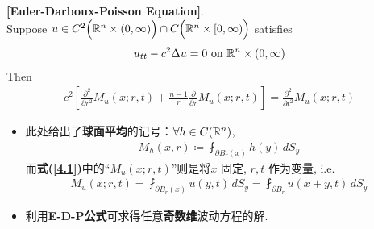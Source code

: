 	\begin{thm}\label{thm 4.1.1}
		\textbf{[Euler-Darboux-Poisson Equation]}. \\
		Suppose $u \in C^2\Big( \mathbb{R}^n \times (0 , \infty) \Big) \cap C \Big( \mathbb{R}^n \times [0 , \infty) \Big)$ satisfies 
		\begin{align*}
			u_{tt} - c^2 \Delta u = 0 \,\, \text{on} \,\, \mathbb{R}^n \times (0 , \infty)
		\end{align*}
		Then 
		\begin{align}
			c^2 \left[ \frac{\partial^2}{\partial r^2} M_{u}(x ; r , t) + \frac{n - 1}{r} \frac{\partial}{\partial r} M_u(x ; r , t) \right] 
			= \frac{\partial^2}{\partial t^2} M_u(x ; r , t) \label{4.1}
		\end{align}
		
		\vspace*{4em}
		
		\begin{rmk}
			\begin{itemize}
				\item 此处给出了\textbf{球面平均}的记号：$\forall h \in C(\mathbb{R}^n)$, 
				\begin{align*}
					M_h(x , r) \coloneqq \fint_{\partial B_{r}(x)} h(y) \, dS_y
				\end{align*}
				而\textbf{式(\ref{4.1})}中的“$M_u(x ; r , t)$”则是将$x$ 固定, $r , t$ 作为变量, i.e. 
				\begin{align*}
					M_u(x ; r , t) 
					= \fint_{\partial B_r(x)} u(y , t) \, dS_y 
					= \fint_{\partial B_r} u(x + y , t) \, dS_y
				\end{align*}
				
				\vspace*{2em}
				
				\item 利用\textbf{E-D-P公式}可求得任意\textbf{奇数维}波动方程的解. 
			\end{itemize}
		\end{rmk}
		
		\newpage
		

\end{thm}
